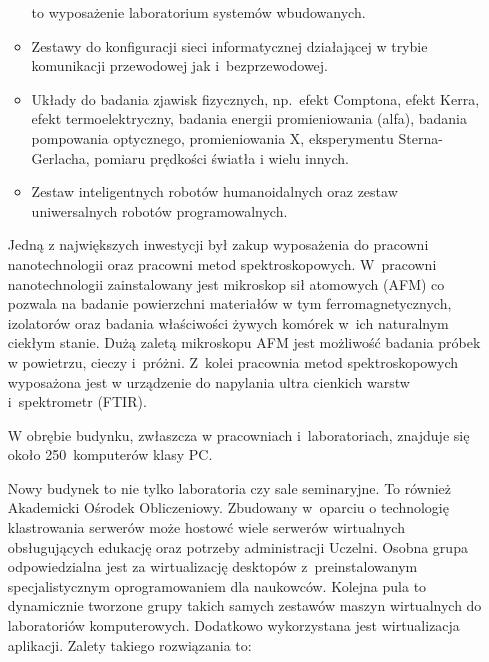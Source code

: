 \documentclass[a4paper,11pt]{article}
\begin{document}
\begin{itemize}
\begin{itemize}
to wyposażenie laboratorium systemów wbudowanych.
\item Zestawy do konfiguracji sieci informatycznej działającej w trybie komunikacji przewodowej jak i~bezprzewodowej.
\item Układy do badania zjawisk fizycznych, np.~efekt Comptona, efekt Kerra, efekt termoelektryczny, badania
energii promieniowania (alfa), badania pompowania optycznego, promieniowania X, eksperymentu
Sterna-Gerlacha, pomiaru prędkości światła i wielu innych.
\item Zestaw inteligentnych robotów humanoidalnych oraz zestaw uniwersalnych robotów programowalnych.
\end{itemize}

Jedną z największych inwestycji był zakup wyposażenia do pracowni nanotechnologii oraz pracowni metod
spektroskopowych. W~pracowni nanotechnologii zainstalowany jest mikroskop sił atomowych (AFM) co
pozwala na badanie powierzchni materiałów w tym ferromagnetycznych, izolatorów oraz badania właściwości
żywych komórek w~ich naturalnym ciekłym stanie. Dużą zaletą mikroskopu AFM jest możliwość badania
próbek w powietrzu, cieczy i~próżni. Z~kolei pracownia metod spektroskopowych wyposażona jest w
urządzenie do napylania ultra cienkich warstw i~spektrometr (FTIR).

W obrębie budynku, zwłaszcza w pracowniach i~laboratoriach, znajduje się około 250~komputerów klasy PC.

Nowy budynek to nie tylko laboratoria czy sale seminaryjne. To również Akademicki Ośrodek Obliczeniowy.
Zbudowany w~oparciu o technologię klastrowania serwerów może hostowć wiele serwerów wirtualnych
obsługujących edukację oraz potrzeby administracji Uczelni. Osobna grupa odpowiedzialna jest za
wirtualizację desktopów z~preinstalowanym specjalistycznym oprogramowaniem dla naukowców. Kolejna pula
to dynamicznie tworzone grupy takich samych zestawów maszyn wirtualnych do laboratoriów
komputerowych. Dodatkowo wykorzystana jest wirtualizacja aplikacji. Zalety takiego rozwiązania to:


\end{itemize}
\end{document}
